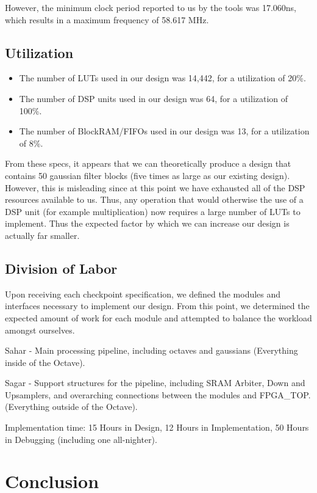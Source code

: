 However, the minimum clock period reported to us by the tools was 17.060ns, 
which results in a maximum frequency of 58.617 MHz.

\subsection{Utilization}

\begin{itemize}\itemsep0em
\item The number of LUTs used in our design was 14,442, for a utilization of 20\%.
\item The number of DSP units used in our design was 64, for a utilization of 100\%.
\item The number of BlockRAM/FIFOs used in our design was 13, for a utilization of 8\%.
\end{itemize}

From these specs, it appears that we can theoretically produce a design that contains 50 gaussian filter blocks (five times as large as
our existing design). However, this is misleading since at this point we have exhausted all of the 
DSP resources available to us. Thus, any operation that would otherwise the use of a DSP unit (for example
multiplication) now requires a large number of LUTs to implement. Thus the expected factor
by which we can increase our design is actually far smaller.

\subsection{Division of Labor}

Upon receiving each checkpoint specification, we defined the modules and interfaces
necessary to implement our design. From this point, we determined the expected 
amount of work for each module and attempted to balance the workload amongst ourselves.

Sahar - Main processing pipeline, including octaves and gaussians (Everything inside of the Octave).

Sagar - Support structures for the pipeline, including SRAM Arbiter, Down and Upsamplers, and
overarching connections between the modules and FPGA\_TOP. (Everything outside of the Octave).

Implementation time: 15 Hours in Design, 12 Hours in Implementation, 50 Hours in Debugging (including one all-nighter).

\section{Conclusion}

